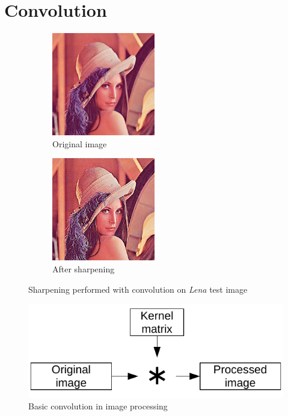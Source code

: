 \section{Convolution}
\begin{figure}[h]
    \centering
    \begin{subfigure}{5cm}
        \centering
        \includegraphics[width=4.5cm]{img/Lena}
        \caption{Original image}
        \label{fig:LenaOriginal}
    \end{subfigure}
    \begin{subfigure}{5cm}
        \centering
        \includegraphics[width=4.5cm]{img/LenaProcessed}
        \caption{After sharpening}
    \end{subfigure}
    \caption{Sharpening performed with convolution on \textit{Lena} test image}
    \label{fig:Lena}
\end{figure}

\begin{figure}[h]
    \centering
    \includegraphics{img/BasicConvolution}
    \caption{Basic convolution in image processing}
    \label{fig:BasicConvolution}
\end{figure}

